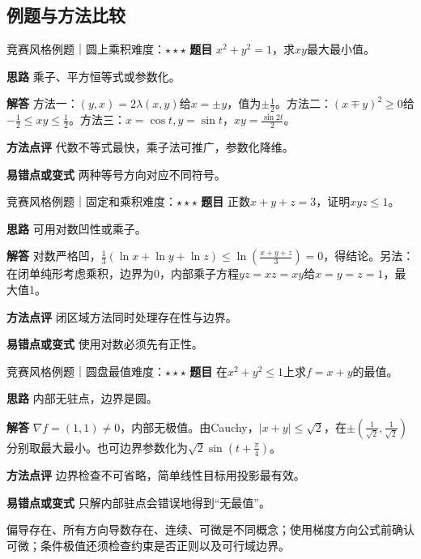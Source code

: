 \subsection{例题与方法比较}
\begin{example}{竞赛风格例题｜圆上乘积}{难度：$\star\star\star$}
\label{ex:6:13}\textbf{题目} $x^2+y^2=1$，求$xy$最大最小值。\par
\textbf{思路} 乘子、平方恒等式或参数化。\par
\textbf{解答} 方法一：$(y,x)=2\lambda(x,y)$给$x=\pm y$，值为$\pm\frac{1}{2}$。方法二：$(x\mp y)^2\ge0$给$-\frac{1}{2}\le xy\le\frac{1}{2}$。方法三：$x=\cos t,y=\sin t$，$xy=\frac{\sin2t}{2}$。\par
\textbf{方法点评} 代数不等式最快，乘子法可推广，参数化降维。\par
\textbf{易错点或变式} 两种等号方向对应不同符号。
\end{example}
\begin{example}{竞赛风格例题｜固定和乘积}{难度：$\star\star\star$}
\label{ex:6:14}\textbf{题目} 正数$x+y+z=3$，证明$xyz\le1$。\par
\textbf{思路} 可用对数凹性或乘子。\par
\textbf{解答} 对数严格凹，$\frac13(\ln x+\ln y+\ln z)\le\ln(\frac{x+y+z}{3})=0$，得结论。另法：在闭单纯形考虑乘积，边界为0，内部乘子方程$yz=xz=xy$给$x=y=z=1$，最大值1。\par
\textbf{方法点评} 闭区域方法同时处理存在性与边界。\par
\textbf{易错点或变式} 使用对数必须先有正性。
\end{example}
\begin{example}{竞赛风格例题｜圆盘最值}{难度：$\star\star\star$}
\label{ex:6:15}\textbf{题目} 在$x^2+y^2\le1$上求$f=x+y$的最值。\par
\textbf{思路} 内部无驻点，边界是圆。\par
\textbf{解答} $\nabla f=(1,1)\ne0$，内部无极值。由Cauchy，$|x+y|\le\sqrt2$，在$\pm(\frac{1}{\sqrt2},\frac{1}{\sqrt2})$分别取最大最小。也可边界参数化为$\sqrt2\sin(t+\frac{\pi}{4})$。\par
\textbf{方法点评} 边界检查不可省略，简单线性目标用投影最有效。\par
\textbf{易错点或变式} 只解内部驻点会错误地得到“无最值”。
\end{example}
\begin{warning}偏导存在、所有方向导数存在、连续、可微是不同概念；使用梯度方向公式前确认可微；条件极值还须检查约束是否正则以及可行域边界。\end{warning}


